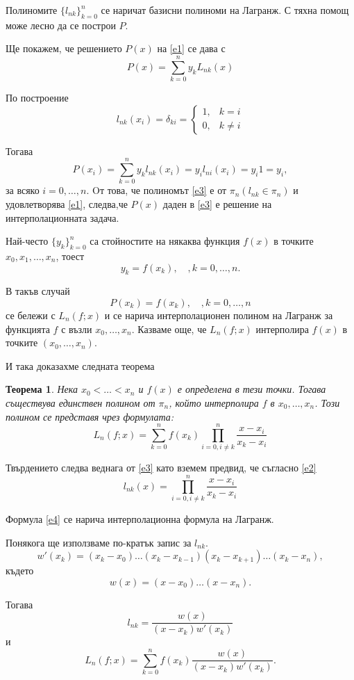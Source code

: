 \documentclass[12pt]{article}
\numberwithin{equation}{section}
\newtheorem{theorem}{Теорема}
\numberwithin{theorem}{section}
\numberwithin{definition}{section}
\numberwithin{corollary}{section}
\begin{document}
Полиномите $\{l_{nk}\}_{k = 0}^n$ се наричат базисни полиноми на Лагранж. С тяхна помощ може лесно да се построи $P$.
\par
Ще покажем, че решението $P(x)$ на \ref{e1} се дава с 
\begin{equation}\label{e3}
P(x) = \displaystyle\sum_{k = 0}^ny_kL_{nk}(x)
\end{equation}
\par
По построение
\[
l_{nk}(x_i) = \delta_{ki} = 
\begin{cases}
1, &k = i\\
0, &k \neq i
\end{cases}
\]
\par
Тогава
\[
P(x_i) = \displaystyle\sum_{k = 0}^ny_kl_{nk}(x_i) = y_il_{ni}(x_i) = y_i1 = y_i,
\]
за всяко $i = 0,\dotso,n$. Oт това, че полиномът \ref{e3} е от $\pi_n (l_{nk}\in\pi_n)$ и удовлетворява \ref{e1}, следва,че $P(x)$ даден в \ref{e3} е решение на интерполационната задача.
\par
Най-често $\{y_k\}_{k=0}^n$ са стойностите на някаква функция $f(x)$ в точките $x_0, x_1,\dotso, x_n$, тоест
\[
y_k = f(x_k),\hspace{12pt}, k = 0, \dotso, n.
\]
\par
В такъв случай
\[
P(x_k) = f(x_k),\hspace{12pt}, k = 0, \dotso, n
\]
се бележи с $L_n(f;x)$ и се нарича интерполационен полином на Лагранж за функцията $f$ с възли $x_0, \dotso, x_n$. Казваме още, че $L_n(f;x)$ интерполира $f(x)$ в точките $(x_0, \dotso, x_n)$.
\par
И така доказахме следната теорема
\begin{theorem}\label{T1}
Нека $x_0 < \dotso < x_n$ и $f(x)$ е определена в тези точки. Тогава съществува единствен полином от $\pi_n$, който интерполира $f$ в $x_0, \dotso, x_n$. Този полином се представя чрез формулата:
\begin{equation}\label{e4}
L_n(f;x) = \displaystyle\sum_{k=0}^nf(x_k)
            \displaystyle\prod_{i = 0, i \neq k}^n\frac{x-x_i}{x_k-x_i}
\end{equation}
\end{theorem}
\par
Твърдението следва веднага от \ref{e3} като вземем предвид, че съгласно \ref{e2}
\[
l_{nk}(x) = \displaystyle\prod_{i = 0, i \neq k}^n
            \frac{x-x_i}{x_k-x_i}
\]
\par
Формула \ref{e4} се нарича интерполационна формула на Лагранж.
\par
Понякога ще използваме по-кратък запис за $l_{nk}$.
\[
w'(x_k) = (x_k - x_0)\dotso(x_k - x_{k-1})(x_k - x_{k+1})\dotso(x_k - x_n),
\]
където
\[
w(x) = (x-x_0)\dotso(x-x_n).
\]
\par
Тогава
\[
l_{nk} = \frac{w(x)}{(x-x_k)w'(x_k)}
\]
и
\[
L_n(f;x) = \displaystyle\sum_{k=0}^nf(x_k)
            \frac{w(x)}{(x-x_k)w'(x_k)}.
\]
\end{document}
